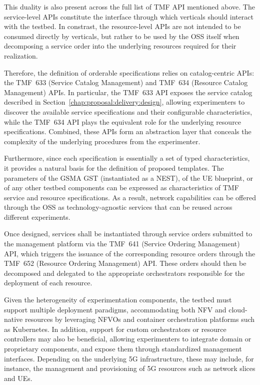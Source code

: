This duality is also present across the full list of \acs{TMF} \acs{API} mentioned above. The service-level \acsp{API} constitute the interface through which verticals should interact with the testbed. In constrast, the resource-level \acsp{API} are not intended to be consumed directly by verticals, but rather to be used by the \acs{OSS} itself when decomposing a service order into the underlying resources required for their realization.

Therefore, the definition of orderable specifications relies on catalog-centric \acsp{API}: the \acs{TMF}~633 (Service Catalog Management) and \acs{TMF}~634 (Resource Catalog Management) \acsp{API}. In particular, the \acs{TMF}~633 \acs{API} exposes the service catalog described in Section~\ref{chap:proposal:delivery:design}, allowing experimenters to discover the available service specifications and their configurable characteristics, while the \acs{TMF}~634 \acs{API} plays the equivalent role for the underlying resource specifications. Combined, these \acsp{API} form an abstraction layer that conceals the complexity of the underlying procedures from the experimenter.

Furthermore, since each specification is essentially a set of typed characteristics, it provides a natural basis for the definition of proposed templates. The parameters of the \acs{GSMA} \acs{GST} (instantiated as a \acs{NEST}), of the \acs{UE} blueprint, or of any other testbed components can be expressed as characteristics of \acs{TMF} service and resource specifications. As a result, network capabilities can be offered through the \acs{OSS} as technology-agnostic services that can be reused across different experiments.

Once designed, services shall be instantiated through service orders submitted to the management platform via the \acs{TMF}~641 (Service Ordering Management) \acs{API}, which triggers the issuance of the corresponding resource orders through the \acs{TMF}~652 (Resource Ordering Management) \acs{API}. These orders should then be decomposed and delegated to the appropriate orchestrators responsible for the deployment of each resource.

Given the heterogeneity of experimentation components, the testbed must support multiple deployment paradigms, accommodating both \acs{NFV} and cloud-native resources by leveraging \acsp{NFVO} and container orchestration platforms such as Kubernetes. In addition, support for custom orchestrators or resource controllers may also be beneficial, allowing experimenters to integrate domain or proprietary components, and expose them through standardized management interfaces. Depending on the underlying \acs{5G} infrastructure, these may include, for instance, the management and provisioning of \acs{5G} resources such as network slices and \acsp{UE}.

